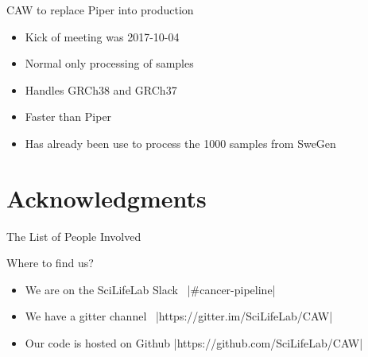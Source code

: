 \documentclass{beamer}
\begin{document}
\begin{frame}{CAW to replace Piper into production}
	\begin{center}
	\end{center}
	\begin{itemize}
		\item Kick of meeting was 2017-10-04
		\pause
		\item Normal only processing of samples
		\pause
		\item Handles GRCh38 and GRCh37
		\pause
		\item Faster than Piper
		\pause
		\item Has already been use to process the 1000 samples from SweGen
	\end{itemize}
\end{frame}

\section{Acknowledgments}

\begin{frame}{The List of People Involved}
	\begin{table}
	\end{table}
\end{frame}

\begin{frame}[fragile]{Where to find us?}
	\begin{itemize}
		\item We are on the SciLifeLab Slack
		\faSlack\ |#cancer-pipeline|
		\pause
		\item We have a gitter channel
		\faGitter\ |https://gitter.im/SciLifeLab/CAW|
		\pause
		\item Our code is hosted on Github
		\faGithub {}|https://github.com/SciLifeLab/CAW|
	\end{itemize}
\end{frame}
\end{document}
